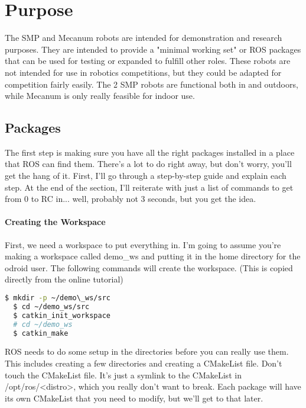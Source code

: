 
\chapter{Purpose}
\label{chap:purpose}

The SMP and Mecanum robots are intended for demonstration and research purposes. They are intended to provide a "minimal working set" or ROS packages that can be used for testing or expanded to fulfill other roles. These robots are not intended for use in robotics competitions, but they could be adapted for competition fairly easily. The 2 SMP robots are functional both in and outdoors, while Mecanum is only really feasible for indoor use.


\section{Packages}

The first step is making sure you have all the right packages installed in a place that ROS can find them. There's a lot to do right away, but don't worry, you'll get the hang of it. First, I'll go through a step-by-step guide and explain each step. At the end of the section, I'll reiterate with just a list of commands to get from 0 to RC in... well, probably not 3 seconds, but you get the idea.

\subsubsection{Creating the Workspace}

First, we need a workspace to put everything in. I'm going to assume you're making a workspace called demo\_ws and putting it in the home directory for the odroid user. The following commands will create the workspace. (This is copied directly from the online tutorial)

\begin{lstlisting}[language=bash]
  $ mkdir -p ~/demo\_ws/src
  $ cd ~/demo_ws/src
  $ catkin_init_workspace
  # cd ~/demo_ws
  $ catkin_make
\end{lstlisting}

ROS needs to do some setup in the directories before you can really use them. This includes creating a few directories and creating a CMakeList file. Don't touch the CMakeList file. It's just a symlink to the CMakeList in /opt/ros/<distro>, which you really don't want to break. Each package will have its own CMakeList that you need to modify, but we'll get to that later.

